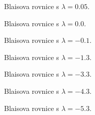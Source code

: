 \begin{figure}[h]
	\centering
	\def\svgwidth{\textwidth}
	
	\caption{Blaisova rovnice s $\lambda = 0.05$.}
\end{figure}

\begin{figure}[h]
	\centering
	\def\svgwidth{\textwidth}
	
	\caption{Blaisova rovnice s $\lambda = 0.0$.}
\end{figure}

\begin{figure}[h]
	\centering
	\def\svgwidth{\textwidth}
	
	\caption{Blaisova rovnice s $\lambda = -0.1$.}
\end{figure}

\begin{figure}[h]
	\centering
	\def\svgwidth{\textwidth}
	
	\caption{Blaisova rovnice s $\lambda = -1.3$.}
\end{figure}

\begin{figure}[h]
	\centering
	\def\svgwidth{\textwidth}
	
	\caption{Blaisova rovnice s $\lambda = -3.3$.}
\end{figure}

\begin{figure}[h]
	\centering
	\def\svgwidth{\textwidth}
	
	\caption{Blaisova rovnice s $\lambda = -4.3$.}
\end{figure}

\begin{figure}[h]
	\centering
	\def\svgwidth{\textwidth}
	
	\caption{Blaisova rovnice s $\lambda = -5.3$.}
\end{figure}


